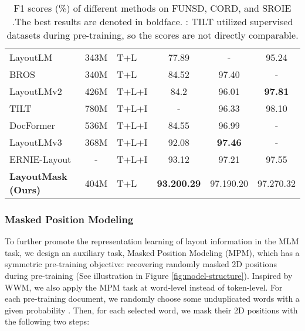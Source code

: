 \documentclass[11pt]{article}
\begin{document}
\begin{table*}
\begin{tabular}{l|c|l|ccc}
LayoutLM  \citep{xu2020layoutlm}    & 343M                  & T+L               & 77.89          &-               & 95.24          \\
BROS \citep{hong2022bros}              & 340M                  & T+L               & 84.52          & 97.40          &-                \\
LayoutLMv2  \citep{xu2021layoutlmv2}        & 426M                  & T+L+I             & 84.2           & 96.01         & \textbf{97.81}          \\
TILT  \citep{powalski2021going}             & 780M                  & T+L+I             & -              & 96.33         & 98.10          \\
DocFormer  \citep{appalaraju2021docformer}        & 536M                  & T+L+I             & 84.55          & 96.99         &-                \\

LayoutLMv3  \citep{huang2022layoutlmv3}       & 368M                  & T+L+I             & 92.08          & \textbf{97.46}         & -               \\
ERNIE-Layout  \citep{peng2022ernie}    & -                     & T+L+I             & 93.12          & 97.21         & 97.55          \\ \hline
\textbf{LayoutMask (Ours)} & 404M                   & T+L               & \textbf{93.200.29}     & 97.190.20    & 97.270.32     \\ \hline
\end{tabular}
\caption{\label{table:sota}
F1 scores (\%) of different methods on FUNSD, CORD, and SROIE .The best results are denoted in boldface. : TILT utilized supervised datasets during pre-training, so the scores are not directly comparable.
}
\end{table*}

\subsubsection{Masked Position Modeling}
\label{sec:mpm}

To further promote the representation learning of layout information in the MLM task, we design an auxiliary task, Masked Position Modeling (MPM), which has a symmetric pre-training objective: recovering randomly masked 2D positions during pre-training (See illustration in Figure \ref{fig:model-structure}).
Inspired by WWM, we also apply the MPM task at word-level instead of token-level.
For each pre-training document, we randomly choose some unduplicated words with a given probability .
Then, for each selected word, we mask their 2D positions with the following two steps:
\end{document}
